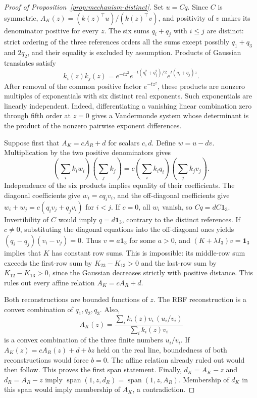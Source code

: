 \begin{proof}[Proof of Proposition~\ref{prop:mechanism-distinct}]
Set $u=Cq$. Since $C$ is symmetric,
$A_K(z)=(k(z)^\top u)/(k(z)^\top v)$, and positivity of $v$ makes
its denominator positive for every $z$. The six sums $q_i+q_j$ with
$i\leq j$ are distinct: strict ordering of the three references orders
all the sums except possibly $q_1+q_3$ and $2q_2$, and their equality
is excluded by assumption. Products of Gaussian translates satisfy
\[
 k_i(z)k_j(z)=
 e^{-tz^2}e^{-t(q_i^2+q_j^2)/2}e^{t(q_i+q_j)z}.
\]
After removal of the common positive factor $e^{-tz^2}$, these products
are nonzero multiples of exponentials with six distinct real exponents.
Such exponentials are linearly independent. Indeed, differentiating a
vanishing linear combination zero through fifth order at $z=0$ gives
a Vandermonde system whose determinant is the product of the nonzero
pairwise exponent differences.

Suppose first that $A_K=cA_R+d$ for scalars $c,d$. Define
$w=u-dv$. Multiplication by the two positive denominators gives
\[
 \left(\sum_i k_iw_i\right)\left(\sum_j k_j\right)
 =c\left(\sum_i k_iq_i\right)\left(\sum_j k_jv_j\right).
\]
Independence of the six products implies equality of their coefficients.
The diagonal coefficients give $w_i=cq_iv_i$, and the off-diagonal
coefficients give
$w_i+w_j=c(q_iv_j+q_jv_i)$ for $i<j$.
If $c=0$, all $w_i$ vanish, so $Cq=dC\mathbf1_3$. Invertibility of
$C$ would imply $q=d\mathbf1_3$, contrary to the distinct references.
If $c\ne0$, substituting the diagonal equations into the off-diagonal
ones yields $(q_i-q_j)(v_i-v_j)=0$. Thus $v=a\mathbf1_3$ for some
$a>0$, and $(K+\lambda I_3)v=\mathbf1_3$ implies that $K$ has
constant row sums. This is impossible: its middle-row sum exceeds the
first-row sum by $K_{23}-K_{13}>0$ and the last-row sum by
$K_{12}-K_{13}>0$, since the Gaussian decreases strictly with positive
distance. This rules out every affine relation $A_K=cA_R+d$.

Both reconstructions are bounded functions of $z$. The RBF reconstruction
is a convex combination of $q_1,q_2,q_3$. Also,
\[
 A_K(z)=\frac{\sum_i k_i(z)v_i\,(u_i/v_i)}
 {\sum_i k_i(z)v_i}
\]
is a convex combination of the three finite numbers $u_i/v_i$.
If $A_K(z)=cA_R(z)+d+bz$ held on the real line, boundedness of both
reconstructions would force $b=0$. The affine relation already ruled out
would then follow. This proves the first span statement. Finally,
$d_K=A_K-z$ and $d_R=A_R-z$ imply
$\operatorname{span}(1,z,d_R)=\operatorname{span}(1,z,A_R)$.
Membership of $d_K$ in this span would imply membership of $A_K$, a
contradiction.
\end{proof}

